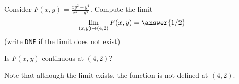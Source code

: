 \documentclass{ximera}
\author{Jim Talamo \and Bart Snapp}
\begin{document}
\begin{exercise}
  Consider $F(x,y) = \frac{xy^2-y^4}{x^2-y^4}$.  Compute the limit
  \[
  \lim_{\point{x,y}\to \point{4,2}} F(x,y) = \answer{1/2}
  \]
  (write \verb|DNE| if the limit does not exist)
  
  \begin{exercise}
  Is $F(x,y)$ continuous at $(4,2)$?
  \begin{multipleChoice}
  \end{multipleChoice}
  
\begin{feedback}[correct]
Note that although the limit exists, the function is not defined at $(4,2)$.
\end{feedback}
  \end{exercise}
\end{exercise}
\end{document}
